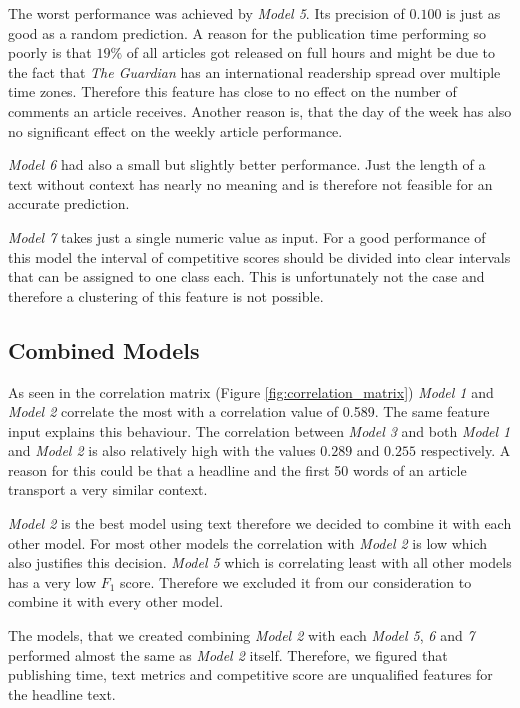 The worst performance was achieved by \textit{Model 5}. Its precision of $0.100$ is just as good as a random prediction. A reason for the publication time performing so poorly is that $19\%$ of all articles got released on full hours and might be due to the fact that \textit{The Guardian} has an international readership spread over multiple time zones. Therefore this feature has close to no effect on the number of comments an article receives. Another reason is, that the day of the week has also no significant effect on the weekly article performance.

\textit{Model 6} had also a small but slightly better performance. Just the length of a text without context has nearly no meaning and is therefore not feasible for an accurate prediction.

\textit{Model 7} takes just a single numeric value as input. For a good performance of this model the interval of competitive scores should be divided into clear intervals that can be assigned to one class each. This is unfortunately not the case and therefore a clustering of this feature is not possible.



\subsection{Combined Models}
As seen in the correlation matrix (Figure \ref{fig:correlation_matrix}) \textit{Model 1} and \textit{Model 2} correlate the most with a correlation value of 0.589. The same feature input explains this behaviour. The correlation between \textit{Model 3} and both \textit{Model 1} and \textit{Model 2} is also relatively high with the values $0.289$ and $0.255$ respectively. A reason for this could be that a headline and the first 50 words of an article transport a very similar context.

\textit{Model 2} is the best model using text therefore we decided to combine it with each other model. For most other models the correlation with \textit{Model 2} is low which also justifies this decision.
\textit{Model 5} which is correlating least with all other models has a very low $F_1$ score. Therefore we excluded it from our consideration to combine it with every other model.

The models, that we created combining \textit{Model 2} with each \textit{Model 5}, \textit{6} and \textit{7} performed almost the same as \textit{Model 2} itself. Therefore, we figured that publishing time, text metrics and competitive score are unqualified features for the headline text.

